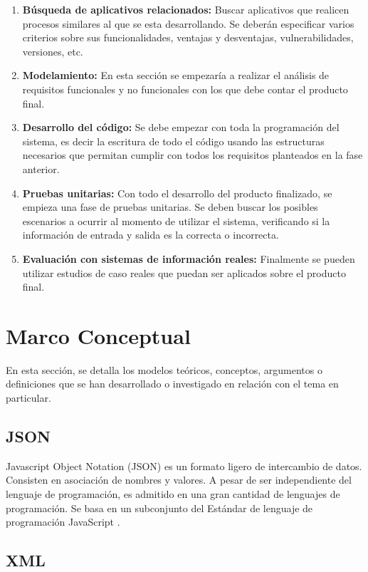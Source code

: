 \documentclass[12pt, openany, xcolor=table]{book}
\begin{document}
	\begin{enumerate}
		\item \textbf{Búsqueda de aplicativos relacionados:} Buscar aplicativos que realicen procesos similares al que se esta desarrollando. Se deberán especificar varios criterios sobre sus funcionalidades, ventajas y desventajas, vulnerabilidades, versiones, etc. 
		\item \textbf{Modelamiento:} En esta sección se empezaría a realizar el análisis de requisitos funcionales y no funcionales con los que debe contar el producto final.
		\item \textbf{Desarrollo del código:} Se debe empezar con toda la programación del sistema, es decir la escritura de todo el código usando las estructuras necesarios que permitan cumplir con todos los requisitos planteados en la fase anterior. 
		\item \textbf{Pruebas unitarias:} Con todo el desarrollo del producto finalizado, se empieza una fase de pruebas unitarias. Se deben buscar los posibles escenarios a ocurrir al momento de utilizar el sistema,  verificando si la información de entrada y salida es la correcta o incorrecta. 		
		\item \textbf{Evaluación con sistemas de información reales:} Finalmente se pueden utilizar estudios de caso reales que puedan ser aplicados sobre el producto final.
	\end{enumerate}
	
	\section{Marco Conceptual}
	En esta sección, se detalla los modelos teóricos, conceptos, argumentos o definiciones que se han desarrollado o investigado en relación con el tema en particular.
	
	\subsection{JSON}
	
	Javascript Object Notation (JSON) es un formato ligero de intercambio de datos. Consisten en asociación de nombres y valores. A pesar de ser independiente del lenguaje de programación, es admitido en una gran cantidad de lenguajes de programación. Se basa en un subconjunto del Estándar de lenguaje de programación JavaScript \cite{JSON}.
	
    \subsection{XML}
    
\end{document}
